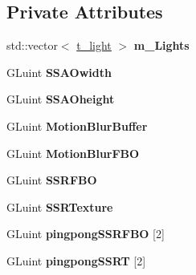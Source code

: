 \subsection*{Private Attributes}
\begin{DoxyCompactItemize}
\item 
std\+::vector$<$ \hyperlink{structt__light}{t\+\_\+light} $>$ {\bfseries m\+\_\+\+Lights}\hypertarget{class_post_process_a0c4eb4ac4ad4d27d48a818e33b5fd18e}{}\label{class_post_process_a0c4eb4ac4ad4d27d48a818e33b5fd18e}

\item 
G\+Luint {\bfseries S\+S\+A\+Owidth}\hypertarget{class_post_process_a270641e52cd73aacd71e79ad6085f938}{}\label{class_post_process_a270641e52cd73aacd71e79ad6085f938}

\item 
G\+Luint {\bfseries S\+S\+A\+Oheight}\hypertarget{class_post_process_a976f4ef1f60fc1c56be30ee4dac9c854}{}\label{class_post_process_a976f4ef1f60fc1c56be30ee4dac9c854}

\item 
G\+Luint {\bfseries Motion\+Blur\+Buffer}\hypertarget{class_post_process_ad31325b68544d62f94e05b765ea5bfe8}{}\label{class_post_process_ad31325b68544d62f94e05b765ea5bfe8}

\item 
G\+Luint {\bfseries Motion\+Blur\+F\+BO}\hypertarget{class_post_process_a497dfb61aa506292933d119394d5d477}{}\label{class_post_process_a497dfb61aa506292933d119394d5d477}

\item 
G\+Luint {\bfseries S\+S\+R\+F\+BO}\hypertarget{class_post_process_a57e865ea7b71520da7f8f6b190c87df6}{}\label{class_post_process_a57e865ea7b71520da7f8f6b190c87df6}

\item 
G\+Luint {\bfseries S\+S\+R\+Texture}\hypertarget{class_post_process_a89ca68b09a9e5e1e6334a4a480d091c5}{}\label{class_post_process_a89ca68b09a9e5e1e6334a4a480d091c5}

\item 
G\+Luint {\bfseries pingpong\+S\+S\+R\+F\+BO} \mbox{[}2\mbox{]}\hypertarget{class_post_process_a429f9ebb91c0bb3aeee0495de728cac8}{}\label{class_post_process_a429f9ebb91c0bb3aeee0495de728cac8}

\item 
G\+Luint {\bfseries pingpong\+S\+S\+RT} \mbox{[}2\mbox{]}\hypertarget{class_post_process_a2578047a4697412f0cd6c013e6198ba5}{}\label{class_post_process_a2578047a4697412f0cd6c013e6198ba5}


\end{DoxyCompactItemize}
